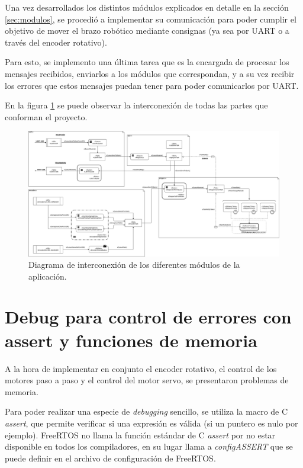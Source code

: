 \documentclass{IEEEtran}
\begin{document}
Una vez desarrollados los distintos módulos explicados en detalle en la sección \ref{sec:modulos}, se procedió a implementar su comunicación para poder cumplir el objetivo de mover el brazo robótico mediante consignas (ya sea por UART o a través del encoder rotativo).

Para esto, se implemento una última tarea que es la encargada de procesar los mensajes recibidos, enviarlos a los módulos que correspondan, y a su vez recibir los errores que estos mensajes puedan tener para poder comunicarlos por UART.

En la figura \ref{fig:diagrama-app} se puede observar la interconexión de todas las partes que conforman el proyecto.

\begin{figure}
    \centering
    \includegraphics[scale=0.35]{../diagrama_app.png}
    \caption{Diagrama de interconexión de los diferentes módulos de la aplicación.}
    \label{fig:diagrama-app}
\end{figure}

\section{Debug para control de errores con assert y funciones de memoria}
\label{sec:debug}

A la hora de implementar en conjunto el encoder rotativo, el control de los motores paso a paso y el control del motor servo, se presentaron problemas de memoria.

Para poder realizar una especie de \textit{debugging} sencillo, se utiliza la macro de C \textit{assert}, que permite verificar si una expresión es válida (si un puntero es nulo por ejemplo). FreeRTOS no llama la función estándar de C \textit{assert} por no estar disponible en todos los compiladores, en su lugar llama a \textit{configASSERT} que se puede definir en el archivo de configuración de FreeRTOS.
\end{document}
